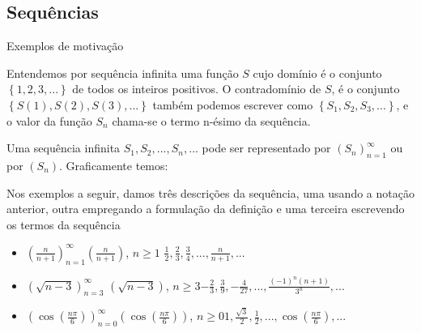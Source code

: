 \maketitle
\newpage
\begin{center}
\section{Sequências}
\end{center}
Exemplos de motivação
\vspace*{4cm}
\begin{df}
	Entendemos por sequência infinita uma função $S$ cujo domínio é o conjunto $\left\lbrace 1, 2,3,...\right\rbrace $ de todos os inteiros positivos. O contradomínio de $S$, é o conjunto $\left\lbrace S(1), S(2),S(3),...\right\rbrace $ também podemos escrever como  $\left\lbrace S_{1}, S_{2},S_{3},...\right\rbrace $, e  o valor da função $S_{n}$ chama-se o termo n-ésimo da sequência.
\end{df}

Uma sequência infinita $S_{1}, S_{2}, ...,S_{n},...$ pode ser representado por $\left( S_{n} \right)^{\infty}_{n=1} $ ou por $\left( S_{n}\right) $. Graficamente temos:
\vspace*{4cm}
\begin{ex} Nos exemplos a seguir, damos três descrições da sequência, uma usando a notação anterior, outra empregando a formulação da definição e uma terceira escrevendo os termos da sequência 
\end{ex}
\begin{itemize}
	\item $\left( \frac{n}{n+1}\right)^{\infty}_{n=1}$\quad \quad$\left( \frac{n}{n+1}\right)$, $n\geq1$ \quad \quad $\frac{1}{2}, \frac{2}{3},\frac{3}{4},...,\frac{n}{n+1},...$
	\item $\left( \sqrt{n-3}\right)^{\infty}_{n=3}$ \quad\quad$\left( \sqrt{n-3}\right)$, $n \geq3$\quad\quad $-\frac{2}{3}, \frac{3}{9},-\frac{4}{27},...,\frac{(-1)^{n}(n+1)}{3^{n}},...$
	\item $\left( \cos (\frac{n\pi}{6})\right)^{\infty}_{n=0}$\quad\quad $\left( \cos (\frac{n\pi}{6})\right)$, $n\geq 0$\quad\quad $1,\frac{\sqrt{3}}{2},\frac{1}{2},...,\cos (\frac{n\pi}{6}),...$
\end{itemize}

